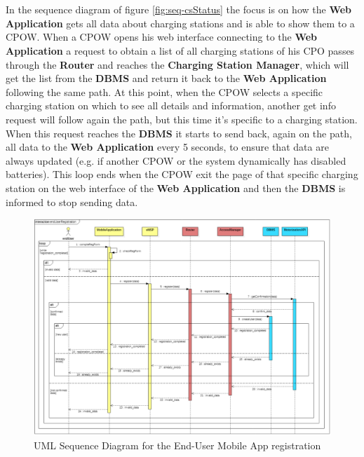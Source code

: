 \documentclass[a4paper]{report}
\begin{document}
\\\\
In the sequence diagram of figure \ref{fig:seq-csStatus} the focus is on how the \textbf{Web Application} gets all data about charging stations and is able to show them to a CPOW. When a CPOW opens his web interface connecting to the \textbf{Web Application} a request to obtain a list of all charging stations of his CPO passes through the \textbf{Router} and reaches the \textbf{Charging Station Manager}, which will get the list from the \textbf{DBMS} and return it back to the \textbf{Web Application} following the same path. At this point, when the CPOW selects a specific charging station on which to see all details and information, another get info request will follow again the path, but this time it's specific to a charging station. When this request reaches the \textbf{DBMS} it starts to send back, again on the path, all data to the  \textbf{Web Application} every 5 seconds, to ensure that data are always updated (e.g. if another CPOW or the system dynamically has disabled batteries). This loop ends when the CPOW exit the page of that specific charging station on the web interface of the \textbf{Web Application} and then the \textbf{DBMS} is informed to stop sending data.

\begin{landscape}
\begin{figure}[hp]
\centering
\includegraphics[scale=0.6]{img/sequenceRegistration.png}
\caption{UML Sequence Diagram for the End-User Mobile App registration}
\label{fig:seq-registration}
\end{figure}
\end{landscape}
\end{document}
